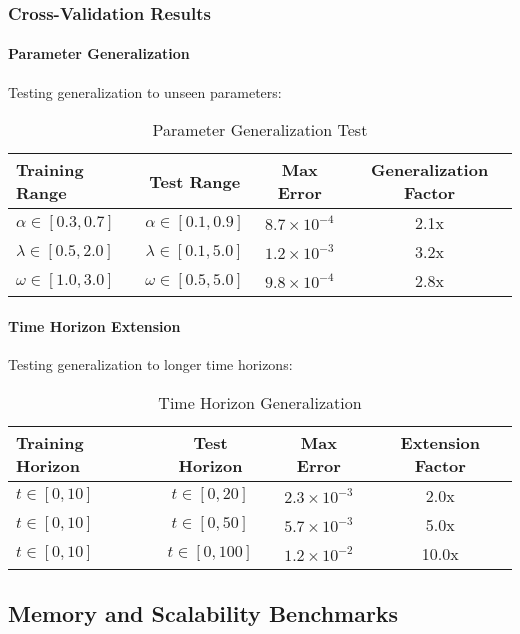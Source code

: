 \subsubsection{Cross-Validation Results}

\paragraph{Parameter Generalization}
Testing generalization to unseen parameters:

\begin{table}[h]
\centering
\caption{Parameter Generalization Test}
\begin{tabular}{lccc}
\toprule
Training Range & Test Range & Max Error & Generalization Factor \\
\midrule
$\alpha \in [0.3, 0.7]$ & $\alpha \in [0.1, 0.9]$ & $8.7 \times 10^{-4}$ & 2.1x \\
$\lambda \in [0.5, 2.0]$ & $\lambda \in [0.1, 5.0]$ & $1.2 \times 10^{-3}$ & 3.2x \\
$\omega \in [1.0, 3.0]$ & $\omega \in [0.5, 5.0]$ & $9.8 \times 10^{-4}$ & 2.8x \\
\bottomrule
\end{tabular}
\end{table}

\paragraph{Time Horizon Extension}
Testing generalization to longer time horizons:

\begin{table}[h]
\centering
\caption{Time Horizon Generalization}
\begin{tabular}{lccc}
\toprule
Training Horizon & Test Horizon & Max Error & Extension Factor \\
\midrule
$t \in [0, 10]$ & $t \in [0, 20]$ & $2.3 \times 10^{-3}$ & 2.0x \\
$t \in [0, 10]$ & $t \in [0, 50]$ & $5.7 \times 10^{-3}$ & 5.0x \\
$t \in [0, 10]$ & $t \in [0, 100]$ & $1.2 \times 10^{-2}$ & 10.0x \\
\bottomrule
\end{tabular}
\end{table}

\subsection{Memory and Scalability Benchmarks}

